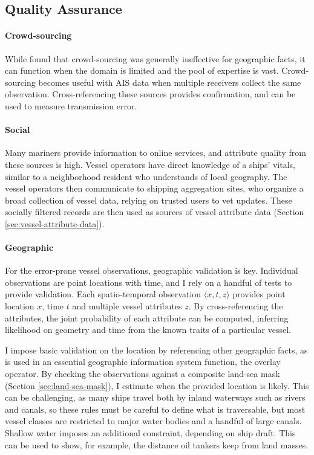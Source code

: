 \subsection{Quality Assurance}
\paragraph{Crowd-sourcing}
While \cite{goodchildli2012} found that crowd-sourcing was generally ineffective for geographic facts, it can function when the domain is limited and the pool of expertise is vast. Crowd-sourcing becomes useful with AIS data when multiple receivers collect the same observation. Cross-referencing these sources provides confirmation, and can be used to measure transmission error.

\paragraph{Social}
Many mariners provide information to online services, and attribute quality from these sources is high. Vessel operators have direct knowledge of a ships' vitals, similar to a neighborhood resident who understands of local geography. The vessel operators then communicate to shipping aggregation sites, who organize a broad collection of vessel data, relying on trusted users to vet updates. These socially filtered records are then used as sources of vessel attribute data (Section \ref{sec:vessel-attribute-data}).

\paragraph{Geographic}
For the error-prone vessel observations, geographic validation is key. Individual observations are point locations with time, and I rely on a handful of tests to provide validation. Each spatio-temporal observation $\langle x, t, z \rangle$ provides point location $x$, time $t$ and multiple vessel attributes $z$.  %
 By cross-referencing the attributes, the joint probability of each attribute can be computed, inferring likelihood on geometry and time from the known traits of a particular vessel.

I impose basic validation on the location by referencing other geographic facts, as is used in an essential geographic information system function, the overlay operator. By checking the observations against a composite land-sea mask (Section \ref{sec:land-sea-mask}), I estimate when the provided location is likely. This can be challenging, as many ships travel both by inland waterways such as rivers and canals, so these rules must be careful to define what is traversable, but most vessel classes are restricted to major water bodies and a handful of large canals. Shallow water imposes an additional constraint, depending on ship draft. This can be used to show, for example, the distance oil tankers keep from land masses.

